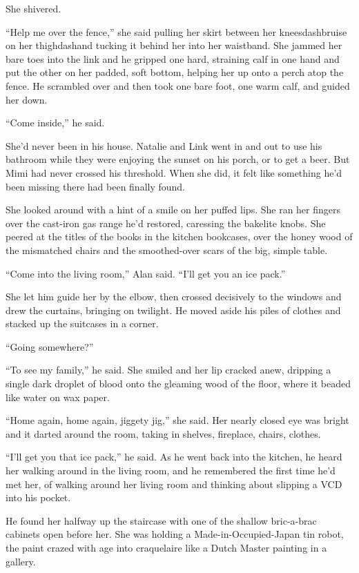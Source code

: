 She shivered.

``Help me over the fence,'' she said pulling her skirt between her
kneesdash{}bruise on her thighdash{}and tucking it behind her into her
waistband.  She jammed her bare toes into the link and he gripped one
hard, straining calf in one hand and put the other on her padded, soft
bottom, helping her up onto a perch atop the fence.  He scrambled over
and then took one bare foot, one warm calf, and guided her down.

``Come inside,'' he said.

She'd never been in his house.  Natalie and Link went in and out to
use his bathroom while they were enjoying the sunset on his porch, or
to get a beer.  But Mimi had never crossed his threshold.  When she
did, it felt like something he'd been missing there had been finally
found.

She looked around with a hint of a smile on her puffed lips.  She ran
her fingers over the cast-iron gas range he'd restored, caressing the
bakelite knobs.  She peered at the titles of the books in the kitchen
bookcases, over the honey wood of the mismatched chairs and the
smoothed-over scars of the big, simple table.

``Come into the living room,'' Alan said.  ``I'll get you an ice
pack.''

She let him guide her by the elbow, then crossed decisively to the
windows and drew the curtains, bringing on twilight.  He moved aside
his piles of clothes and stacked up the suitcases in a corner.

``Going somewhere?''

``To see my family,'' he said.  She smiled and her lip cracked anew,
dripping a single dark droplet of blood onto the gleaming wood of the
floor, where it beaded like water on wax paper.

``Home again, home again, jiggety jig,'' she said.  Her nearly closed
eye was bright and it darted around the room, taking in shelves,
fireplace, chairs, clothes.

``I'll get you that ice pack,'' he said.  As he went back into the
kitchen, he heard her walking around in the living room, and he
remembered the first time he'd met her, of walking around her living
room and thinking about slipping a VCD into his pocket.

He found her halfway up the staircase with one of the shallow
bric-a-brac cabinets open before her.  She was holding a
Made-in-Occupied-Japan tin robot, the paint crazed with age into
craquelaire like a Dutch Master painting in a gallery.

